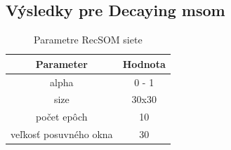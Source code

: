 \subsection{Výsledky pre Decaying msom}
\begin{table}[h!]
    \centering
    \begin{tabular}{|c|c|} 
     \hline
     Parameter & Hodnota \\ 
     \hline\hline
     alpha & 0 - 1  \\ 
     \hline
     size & 30x30  \\
     \hline
     počet epôch & 10  \\
     \hline
     veľkosť posuvného okna & 30  \\
     \hline
    \end{tabular}
    \caption{Parametre RecSOM siete}
    \label{table:1}
    \end{table}
    

